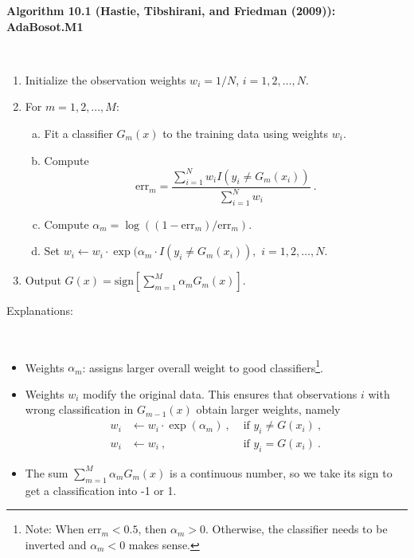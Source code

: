 \documentclass[
  10pt,
  ignorenonframetext,
]{beamer}
\providecommand{\tightlist}{%
  \setlength{\itemsep}{0pt}\setlength{\parskip}{0pt}}
\begin{document}
\begin{frame}
\textbf{Algorithm 10.1 (Hastie, Tibshirani, and Friedman (2009)):
AdaBosot.M1}

\(~\)

\begin{enumerate}
\tightlist
\item
  Initialize the observation weights \(w_i= 1/N\), \(i=1,2,\ldots, N\).
\end{enumerate}

\vspace{2mm}

\begin{enumerate}
\setcounter{enumi}{1}
\tightlist
\item
  For \(m=1,2,...,M\):

  \begin{enumerate}
  [a)]
  \tightlist
  \item
    Fit a classifier \(G_m(x)\) to the training data using weights
    \(w_i\).
  \item
    Compute
    \[\text{err}_m = \frac{\sum_{i=1}^N w_i I(y_i\neq G_m(x_i))}{\sum_{i=1}^N w_i} \ .\]
  \item
    Compute \(\alpha_m = \log((1-\text{err}_m)/\text{err}_m)\).
  \item
    Set
    \(w_i \leftarrow w_i \cdot \exp(\alpha_m \cdot I(y_i\neq G_m(x_i)),\)
    \(i=1,2,\ldots, N\).
  \end{enumerate}
\end{enumerate}

\vspace{2mm}

\begin{enumerate}
\setcounter{enumi}{2}
\tightlist
\item
  Output
  \(G(x) = \text{sign}\left[\sum_{m=1}^M \alpha_m G_m(x)\right]\).
\end{enumerate}
\end{frame}

\begin{frame}
Explanations:

\(~\)

\begin{itemize}
\item
  Weights \(\alpha_m\): assigns larger overall weight to good
  classifiers\footnote{Note: When $\text{err}_m<0.5$, then $\alpha_m>0$. Otherwise, the classifier needs to be inverted and $\alpha_m<0$ makes sense.}.
\item
  Weights \(w_i\) modify the original data. This ensures that
  observations \(i\) with wrong classification in \(G_{m-1}(x)\) obtain
  larger weights, namely \begin{align*} 
   w_i &\leftarrow w_i \cdot \exp(\alpha_m) \ , &\text{ if } y_i \neq G(x_i) \ , \\
   w_i &\leftarrow w_i \ , &\text{ if } y_i = G(x_i) \ .
   \end{align*}
\item
  The sum \(\sum_{m=1}^M \alpha_m G_m(x)\) is a continuous number, so we
  take its sign to get a classification into -1 or 1.
\end{itemize}
\end{frame}
\end{document}
